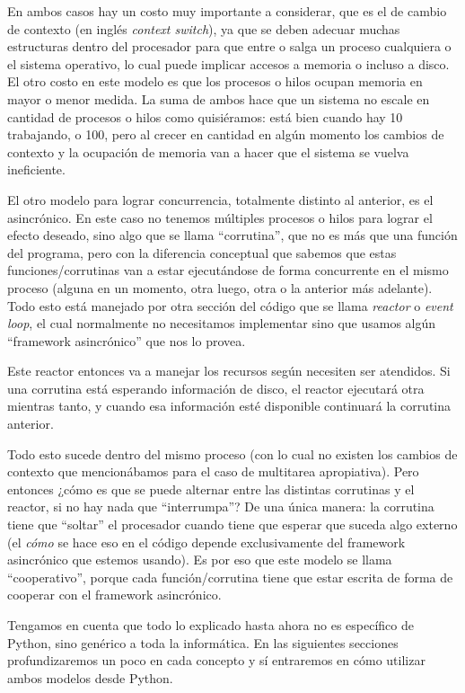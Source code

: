 En ambos casos hay un costo muy importante a considerar, que es el de cambio de contexto (en inglés \textit{context switch}), ya que se deben adecuar muchas estructuras dentro del procesador para que entre o salga un proceso cualquiera o el sistema operativo, lo cual puede implicar accesos a memoria o incluso a disco. El otro costo en este modelo es que los procesos o hilos ocupan memoria en mayor o menor medida. La suma de ambos hace que un sistema no escale en cantidad de procesos o hilos como quisiéramos: está bien cuando hay 10 trabajando, o 100, pero al crecer en cantidad en algún momento los cambios de contexto y la ocupación de memoria van a hacer que el sistema se vuelva ineficiente.

El otro modelo para lograr concurrencia, totalmente distinto al anterior, es el asincrónico. En este caso no tenemos múltiples procesos o hilos para lograr el efecto deseado, sino algo que se llama ``corrutina'', que no es más que una función del programa, pero con la diferencia conceptual que sabemos que estas funciones/corrutinas van a estar ejecutándose de forma concurrente en el mismo proceso (alguna en un momento, otra luego, otra o la anterior más adelante). Todo esto está manejado por otra sección del código que se llama \textit{reactor} o \textit{event loop}, el cual normalmente no necesitamos implementar sino que usamos algún ``framework asincrónico'' que nos lo provea.

Este reactor entonces va a manejar los recursos según necesiten ser atendidos. Si una corrutina está esperando información de disco, el reactor ejecutará otra mientras tanto, y cuando esa información esté disponible continuará la corrutina anterior.

Todo esto sucede dentro del mismo proceso (con lo cual no existen los cambios de contexto que mencionábamos para el caso de multitarea apropiativa). Pero entonces ¿cómo es que se puede alternar entre las distintas corrutinas y el reactor, si no hay nada que ``interrumpa''? De una única manera: la corrutina tiene que ``soltar'' el procesador cuando tiene que esperar que suceda algo externo (el \textit{cómo} se hace eso en el código depende exclusivamente del framework asincrónico que estemos usando). Es por eso que este modelo se llama ``cooperativo'', porque cada función/corrutina tiene que estar escrita de forma de cooperar con el framework asincrónico.

Tengamos en cuenta que todo lo explicado hasta ahora no es específico de Python, sino genérico a toda la informática. En las siguientes secciones profundizaremos un poco en cada concepto y sí entraremos en cómo utilizar ambos modelos desde Python.

